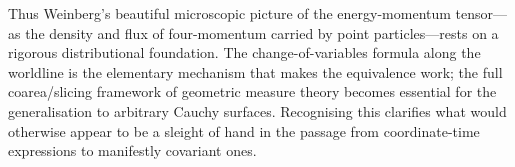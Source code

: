 \noindent
Thus Weinberg's beautiful microscopic picture of the
energy-momentum tensor---as the density and flux of four-momentum
carried by point particles---rests on a rigorous distributional
foundation.  The change-of-variables formula along the worldline is the
elementary mechanism that makes the equivalence work; the full
coarea/slicing framework of geometric measure theory becomes
essential for the generalisation to arbitrary Cauchy surfaces.  Recognising this clarifies what would otherwise appear to
be a sleight of hand in the passage from coordinate-time
expressions to manifestly covariant ones.
